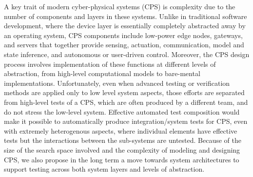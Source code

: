A key trait of modern cyber-physical systems (CPS) is complexity due to the number of components and layers in these systems.  Unlike in traditional software development, where the device layer is essentially completely abstracted away by an operating system, CPS components include low-power edge nodes, gateways, and servers that together provide sensing, actuation, communication, model and state inference, and autonomous or user-driven control.  Moreover, the CPS design process involves implementation of these functions at different levels of abstraction, from high-level computational models to bare-mental implementations. Unfortunately, even when advanced testing or verification methods are applied only to low level system aspects, those efforts are separated from high-level tests of a CPS, which are often produced by a different team, and do not stress the low-level system.  Effective automated test composition would make it possible to automatically produce integration/system tests for CPS, even with extremely heterogenous aspects, where individual elements have effective tests but the interactions between the sub-systems are untested.  Because of the size of the search space involved and the complexity of modeling and designing CPS, we also propose in the long term a move towards system architectures to support testing across both system layers and levels of abstraction.

